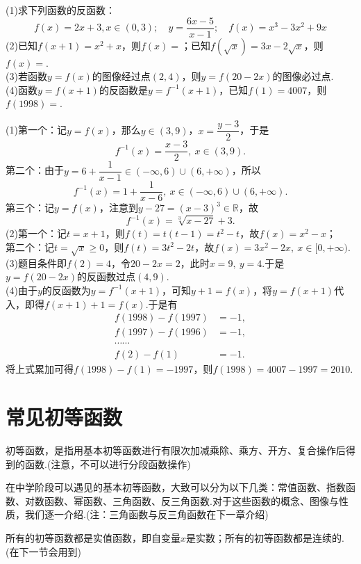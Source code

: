 \documentclass[lang=cn, zihao=5]{elegantbook}
\newcommand{\R}{\mathbb{R}}
\newcommand{\tk}{\uline{\hspace{4em}}}
\begin{document}
\begin{example}
	(1)求下列函数的反函数：$$f(x)=2x+3,x\in (0,3);\quad y=\frac{6x-5}{x-1};\quad f(x)=x^3-3x^2+9x$$
	(2)已知$f(x+1)=x^2+x$，则$f(x)=$\tk ；已知$f(\sqrt{x})=3x-2\sqrt{x}$，则$f(x)=$\tk . \\
	(3)若函数$y=f(x)$的图像经过点$(2,4)$，则$y=f(20-2x)$的图像必过点\tk . \\
	(4)函数$y=f(x+1)$的反函数是$y=f^{-1}(x+1)$，已知$f(1)=4007$，则$f(1998)=$\tk . \\
\end{example}
\begin{solution}
	(1)第一个：记$y=f(x)$，那么$y \in (3,9)$，$x=\dfrac{y-3}{2}$，于是$$f^{-1}(x)=\frac{x-3}{2},~x \in (3,9).$$
	第二个：由于$y=6+\dfrac{1}{x-1} \in (-\infty ,6)\cup (6,+\infty)$，所以$$f^{-1}(x) = 1+\frac{1}{x-6},~x \in (-\infty ,6)\cup (6,+\infty).$$
	第三个：记$y=f(x)$，注意到$y-27=(x-3)^3 \in \R$，故$$f^{-1}(x) = \sqrt[3]{x-27}+3.$$
	(2)第一个：记$t=x+1$，则$f(t)=t(t-1)=t^2-t$，故$f(x)=x^2-x$； \\
	第二个：记$t=\sqrt{x} \geq 0$，则$f(t)=3t^2-2t$，故$f(x)=3x^2-2x,~x \in [0,+\infty )$. \\
	(3)题目条件即$f(2)=4$，令$20-2x=2$，此时$x=9,~y=4$.于是$y=f(20-2x)$的反函数过点$(4,9)$. \\
	(4)由于$y$的反函数为$y=f^{-1}(x+1)$，可知$y+1=f(x)$，将$y=f(x+1)$代入，即得$f(x+1)+1=f(x)$.于是有
	\begin{align*}
		f(1998)-f(1997)&=-1, \\
		f(1997)-f(1996)&=-1, \\
		\cdots \cdots \\
		f(2)-f(1)&=-1.
	\end{align*}
	将上式累加可得$f(1998)-f(1)=-1997$，则$f(1998)=4007-1997=2010$.
\end{solution}

\newpage
\section{常见初等函数}

初等函数，是指用基本初等函数进行有限次加减乘除、乘方、开方、复合操作后得到的函数.(注意，不可以进行分段函数操作)

在中学阶段可以遇见的基本初等函数，大致可以分为以下几类：常值函数、指数函数、对数函数、幂函数、三角函数、反三角函数.对于这些函数的概念、图像与性质，我们逐一介绍.(注：三角函数与反三角函数在下一章介绍)

所有的初等函数都是实值函数，即自变量$x$是实数；所有的初等函数都是连续的.(在下一节会用到)
\end{document}

